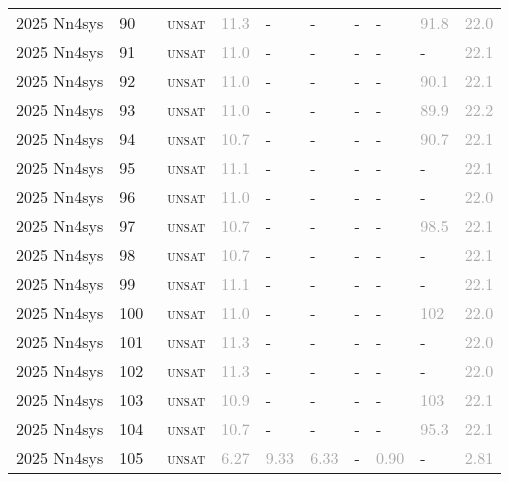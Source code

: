 \begin{center}
{\begin{longtable}{@{}llllllllll@{}}
2025 Nn4sys & 90 & ~\textsc{unsat} & \textcolor{darkgray}{11.3} & - & - & - & - & \textcolor{darkgray}{91.8} & \textcolor{darkgray}{22.0} \\
2025 Nn4sys & 91 & ~\textsc{unsat} & \textcolor{darkgray}{11.0} & - & - & - & - & - & \textcolor{darkgray}{22.1} \\
2025 Nn4sys & 92 & ~\textsc{unsat} & \textcolor{darkgray}{11.0} & - & - & - & - & \textcolor{darkgray}{90.1} & \textcolor{darkgray}{22.1} \\
2025 Nn4sys & 93 & ~\textsc{unsat} & \textcolor{darkgray}{11.0} & - & - & - & - & \textcolor{darkgray}{89.9} & \textcolor{darkgray}{22.2} \\
2025 Nn4sys & 94 & ~\textsc{unsat} & \textcolor{darkgray}{10.7} & - & - & - & - & \textcolor{darkgray}{90.7} & \textcolor{darkgray}{22.1} \\
2025 Nn4sys & 95 & ~\textsc{unsat} & \textcolor{darkgray}{11.1} & - & - & - & - & - & \textcolor{darkgray}{22.1} \\
2025 Nn4sys & 96 & ~\textsc{unsat} & \textcolor{darkgray}{11.0} & - & - & - & - & - & \textcolor{darkgray}{22.0} \\
2025 Nn4sys & 97 & ~\textsc{unsat} & \textcolor{darkgray}{10.7} & - & - & - & - & \textcolor{darkgray}{98.5} & \textcolor{darkgray}{22.1} \\
2025 Nn4sys & 98 & ~\textsc{unsat} & \textcolor{darkgray}{10.7} & - & - & - & - & - & \textcolor{darkgray}{22.1} \\
2025 Nn4sys & 99 & ~\textsc{unsat} & \textcolor{darkgray}{11.1} & - & - & - & - & - & \textcolor{darkgray}{22.1} \\
2025 Nn4sys & 100 & ~\textsc{unsat} & \textcolor{darkgray}{11.0} & - & - & - & - & \textcolor{darkgray}{102} & \textcolor{darkgray}{22.0} \\
2025 Nn4sys & 101 & ~\textsc{unsat} & \textcolor{darkgray}{11.3} & - & - & - & - & - & \textcolor{darkgray}{22.0} \\
2025 Nn4sys & 102 & ~\textsc{unsat} & \textcolor{darkgray}{11.3} & - & - & - & - & - & \textcolor{darkgray}{22.0} \\
2025 Nn4sys & 103 & ~\textsc{unsat} & \textcolor{darkgray}{10.9} & - & - & - & - & \textcolor{darkgray}{103} & \textcolor{darkgray}{22.1} \\
2025 Nn4sys & 104 & ~\textsc{unsat} & \textcolor{darkgray}{10.7} & - & - & - & - & \textcolor{darkgray}{95.3} & \textcolor{darkgray}{22.1} \\
2025 Nn4sys & 105 & ~\textsc{unsat} & \textcolor{darkgray}{6.27} & \textcolor{darkgray}{9.33} & \textcolor{darkgray}{6.33} & - & \textcolor{darkgray}{0.90} & - & \textcolor{darkgray}{2.81} \\

\end{longtable}}
\end{center}

